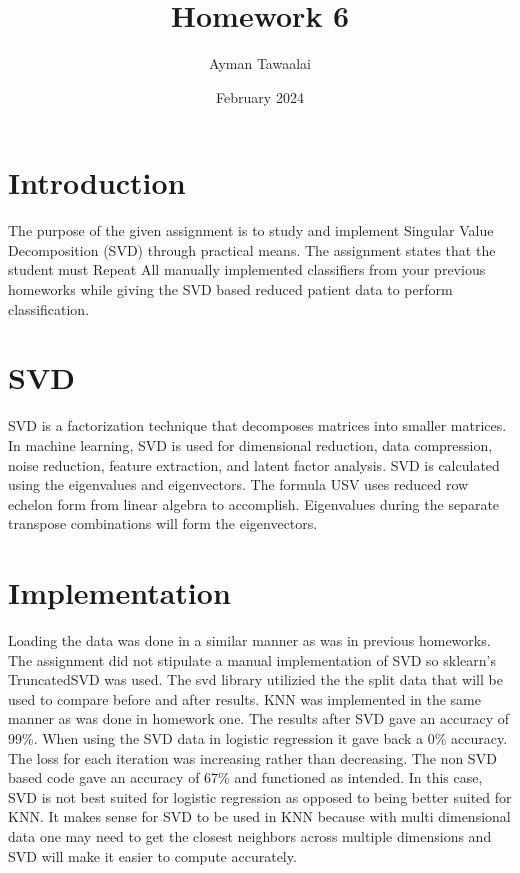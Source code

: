 \documentclass{article}
\title{Homework 6}
\author{Ayman Tawaalai}
\date{February 2024}
\begin{document}
\maketitle

\section{Introduction}
The purpose of the given assignment is to study and implement Singular Value Decomposition (SVD) through practical means. The assignment states that the student must Repeat All manually implemented classifiers from your previous homeworks while giving the SVD based reduced patient data to perform classification.

\section{SVD}
SVD is a factorization technique that decomposes matrices into smaller matrices. In machine learning, SVD is used for dimensional reduction, data compression, noise reduction, feature extraction, and latent factor analysis. SVD is calculated using the eigenvalues and eigenvectors. The formula USV uses reduced row echelon form from linear algebra to accomplish. Eigenvalues during the separate transpose combinations will form the eigenvectors. 

\section{Implementation}
Loading the data was done in a similar manner as was in previous homeworks. The assignment did not stipulate a manual implementation of SVD so sklearn's TruncatedSVD was used. The svd library utilizied the the split data that will be used to compare before and after results. KNN was implemented in the same manner as was done in homework one. The results after SVD gave an accuracy of 99\%. When using the SVD data in logistic regression it gave back a 0\% accuracy. The loss for each iteration was increasing rather than decreasing. The non SVD based code gave an accuracy of 67\% and functioned as intended. In this case, SVD is not best suited for logistic regression as opposed to being better suited for KNN. It makes sense for SVD to be used in KNN because with multi dimensional data one may need to get the closest neighbors across multiple dimensions and SVD will make it easier to compute accurately.
\end{document}
